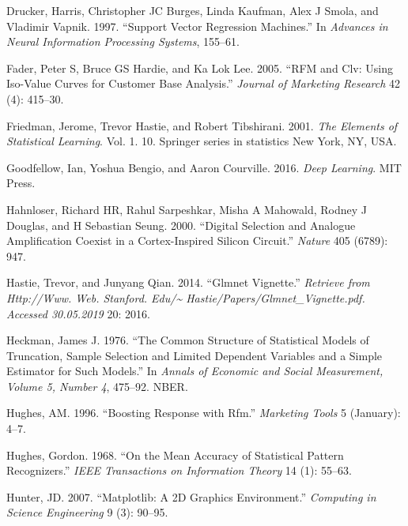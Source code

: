 \documentclass[
  11pt,
  a4paper,
  DIV=12,captions=tableheading,oneside,titlepage]{scrbook}
\begin{document}
\leavevmode\hypertarget{ref-drucker1997support}{}%
Drucker, Harris, Christopher JC Burges, Linda Kaufman, Alex J Smola, and Vladimir Vapnik. 1997. ``Support Vector Regression Machines.'' In \emph{Advances in Neural Information Processing Systems}, 155--61.

\leavevmode\hypertarget{ref-fader2005rfmclv}{}%
Fader, Peter S, Bruce GS Hardie, and Ka Lok Lee. 2005. ``RFM and Clv: Using Iso-Value Curves for Customer Base Analysis.'' \emph{Journal of Marketing Research} 42 (4): 415--30.

\leavevmode\hypertarget{ref-friedman2001elements}{}%
Friedman, Jerome, Trevor Hastie, and Robert Tibshirani. 2001. \emph{The Elements of Statistical Learning}. Vol. 1. 10. Springer series in statistics New York, NY, USA.

\leavevmode\hypertarget{ref-goodfellow2016deep}{}%
Goodfellow, Ian, Yoshua Bengio, and Aaron Courville. 2016. \emph{Deep Learning}. MIT Press.

\leavevmode\hypertarget{ref-hahnloser2000digital}{}%
Hahnloser, Richard HR, Rahul Sarpeshkar, Misha A Mahowald, Rodney J Douglas, and H Sebastian Seung. 2000. ``Digital Selection and Analogue Amplification Coexist in a Cortex-Inspired Silicon Circuit.'' \emph{Nature} 405 (6789): 947.

\leavevmode\hypertarget{ref-hastie2014glmnet}{}%
Hastie, Trevor, and Junyang Qian. 2014. ``Glmnet Vignette.'' \emph{Retrieve from Http://Www. Web. Stanford. Edu/\textasciitilde{} Hastie/Papers/Glmnet\_Vignette.pdf. Accessed 30.05.2019} 20: 2016.

\leavevmode\hypertarget{ref-heckman1976common}{}%
Heckman, James J. 1976. ``The Common Structure of Statistical Models of Truncation, Sample Selection and Limited Dependent Variables and a Simple Estimator for Such Models.'' In \emph{Annals of Economic and Social Measurement, Volume 5, Number 4}, 475--92. NBER.

\leavevmode\hypertarget{ref-hughes-rfm-boost-response}{}%
Hughes, AM. 1996. ``Boosting Response with Rfm.'' \emph{Marketing Tools} 5 (January): 4--7.

\leavevmode\hypertarget{ref-hughes1968mean}{}%
Hughes, Gordon. 1968. ``On the Mean Accuracy of Statistical Pattern Recognizers.'' \emph{IEEE Transactions on Information Theory} 14 (1): 55--63.

\leavevmode\hypertarget{ref-hunter2007matplotlib}{}%
Hunter, JD. 2007. ``Matplotlib: A 2D Graphics Environment.'' \emph{Computing in Science Engineering} 9 (3): 90--95.
\end{document}

